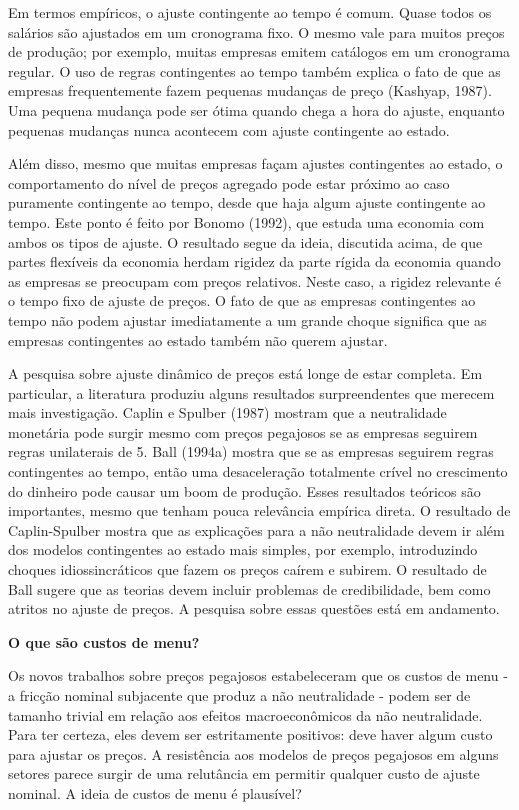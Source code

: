 \documentclass[a4paper,12pt]{article}[abntex2]
\begin{document}
Em termos empíricos, o ajuste contingente ao tempo é comum. Quase todos os salários são ajustados em um cronograma fixo. O mesmo vale para muitos preços de produção; por exemplo, muitas empresas emitem catálogos em um cronograma regular. O uso de regras contingentes ao tempo também explica o fato de que as empresas frequentemente fazem pequenas mudanças de preço (Kashyap, 1987). Uma pequena mudança pode ser ótima quando chega a hora do ajuste, enquanto pequenas mudanças nunca acontecem com ajuste contingente ao estado.

Além disso, mesmo que muitas empresas façam ajustes contingentes ao estado, o comportamento do nível de preços agregado pode estar próximo ao caso puramente contingente ao tempo, desde que haja algum ajuste contingente ao tempo. Este ponto é feito por Bonomo (1992), que estuda uma economia com ambos os tipos de ajuste. O resultado segue da ideia, discutida acima, de que partes flexíveis da economia herdam rigidez da parte rígida da economia quando as empresas se preocupam com preços relativos. Neste caso, a rigidez relevante é o tempo fixo de ajuste de preços. O fato de que as empresas contingentes ao tempo não podem ajustar imediatamente a um grande choque significa que as empresas contingentes ao estado também não querem ajustar.

A pesquisa sobre ajuste dinâmico de preços está longe de estar completa. Em particular, a literatura produziu alguns resultados surpreendentes que merecem mais investigação. Caplin e Spulber (1987) mostram que a neutralidade monetária pode surgir mesmo com preços pegajosos se as empresas seguirem regras unilaterais de 5. Ball (1994a) mostra que se as empresas seguirem regras contingentes ao tempo, então uma desaceleração totalmente crível no crescimento do dinheiro pode causar um boom de produção. Esses resultados teóricos são importantes, mesmo que tenham pouca relevância empírica direta. O resultado de Caplin-Spulber mostra que as explicações para a não neutralidade devem ir além dos modelos contingentes ao estado mais simples, por exemplo, introduzindo choques idiossincráticos que fazem os preços caírem e subirem. O resultado de Ball sugere que as teorias devem incluir problemas de credibilidade, bem como atritos no ajuste de preços. A pesquisa sobre essas questões está em andamento.

\textbf{O que são custos de menu?}

Os novos trabalhos sobre preços pegajosos estabeleceram que os custos de menu - a fricção nominal subjacente que produz a não neutralidade - podem ser de tamanho trivial em relação aos efeitos macroeconômicos da não neutralidade. Para ter certeza, eles devem ser estritamente positivos: deve haver algum custo para ajustar os preços. A resistência aos modelos de preços pegajosos em alguns setores parece surgir de uma relutância em permitir qualquer custo de ajuste nominal. A ideia de custos de menu é plausível?
\end{document}
